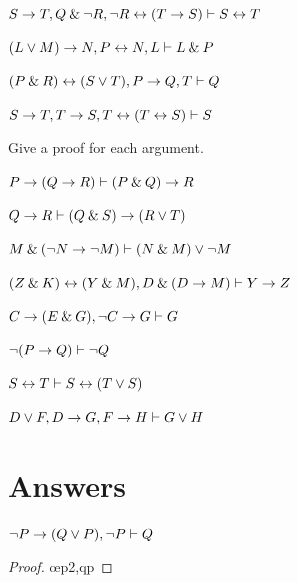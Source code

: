 \begin{small}
\begin{earg}
\item $S \rightarrow T, Q \mathbin{\&} {\neg} R, {\neg} R \leftrightarrow (T \rightarrow S) \vdash S \leftrightarrow T $\smallskip
\item $(L \vee M) \rightarrow N, P \leftrightarrow N, L \vdash L \mathbin{\&} P$\smallskip
\item $(P \mathbin{\&} R) \leftrightarrow (S \vee T), P \rightarrow Q, T \vdash Q$\smallskip
\item $S \rightarrow T, T \rightarrow S, T \leftrightarrow (T \leftrightarrow S) \vdash S$\smallskip
\end{earg}


\problempart
Give a proof for each argument.
\begin{earg}
\item $P \rightarrow (Q \rightarrow R) \vdash (P \mathbin{\&} Q) \rightarrow R$\smallskip
\item $Q \rightarrow R \vdash (Q \mathbin{\&} S) \rightarrow (R \vee T)$\smallskip 
\item $M \mathbin{\&} ({\neg} N \rightarrow {\neg} M) \vdash (N \mathbin{\&} M) \vee {\neg} M$\smallskip
\item $(Z\mathbin{\&} K)\leftrightarrow(Y\mathbin{\&} M), D\mathbin{\&}(D\rightarrow M) \vdash Y\rightarrow Z$\smallskip
\item $C\rightarrow(E\mathbin{\&} G), {\neg} C \rightarrow G \vdash G$\smallskip
\item ${\neg}(P \rightarrow Q) \vdash {\neg} Q$\smallskip
\item $S \leftrightarrow T \vdash S \leftrightarrow (T \vee S)$\smallskip 
\item $D \vee F, D \rightarrow G, F \rightarrow H \vdash G \vee H$\smallskip
\end{earg}






\section{Answers}
\setcounter{ProbPart}{0}

\problempart
\begin{earg}
\item ${\neg} P \rightarrow (Q \vee P), {\neg} P \vdash Q$
\begin{proof}
	 \pr{}
	 \pr{}
	 
	 \oe{p2,qp}
\end{proof}
\medskip


\end{earg}
\end{small}
